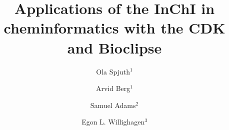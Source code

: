 \documentclass[10pt]{bmc_article}
\newenvironment{bmcformat}{\fussy\setboolean{publ}{true}}{\fussy}
\begin{document}
\begin{bmcformat}



\title{Applications of the InChI in cheminformatics with the CDK and Bioclipse}
 



\author{Ola Spjuth\correspondingauthor$^{1}$%
      \and
         Arvid Berg$^1$%
      \and
         Samuel Adams$^2$%
      \and    
         Egon L. Willighagen$^3$%
      }
      
      


\address{\\
\iid(1) Department of Pharmaceutical Biosciences, Uppsala University, 751 24 Uppsala, Sweden\\
\iid(2) Unilever Centre for Molecular Sciences Informatics, University Chemical Laboratory, Cambridge, CB2 1EW, United Kingdom\\
\iid(3) Department of Bioinformatics - BiGCaT, Maastricht University, Maastricht, NL-6200 MD, The Netherlands}




\maketitle


\end{bmcformat}
\end{document}

